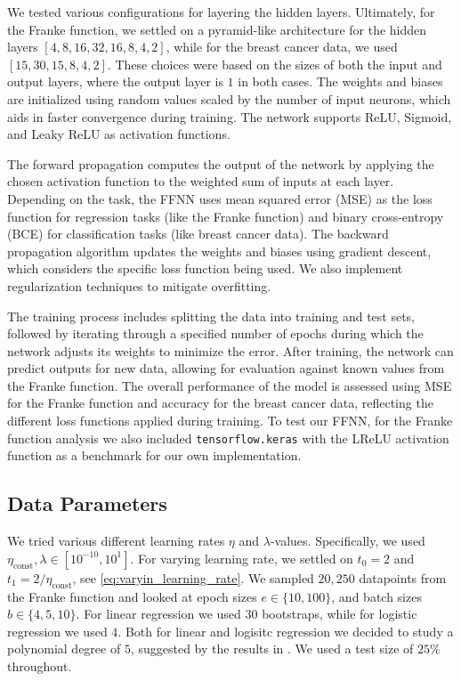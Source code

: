 \documentclass[%
reprint,s
amsmath,amssymb,
aps,
]{revtex4-2}
\begin{document}
We tested various configurations for layering the hidden layers. Ultimately, for the Franke function, we settled on a pyramid-like architecture for the hidden layers \([4,8,16,32,16,8,4,2]\), while for the breast cancer data, we used \([15,30,15,8,4,2]\). These choices were based on the sizes of both the input and output layers, where the output layer is \(1\) in both cases. The weights and biases are initialized using random values scaled by the number of input neurons, which aids in faster convergence during training. The network supports ReLU, Sigmoid, and Leaky ReLU as activation functions. 

The forward propagation computes the output of the network by applying the chosen activation function to the weighted sum of inputs at each layer. Depending on the task, the FFNN uses mean squared error (MSE) as the loss function for regression tasks (like the Franke function) and binary cross-entropy (BCE) for classification tasks (like breast cancer data). The backward propagation algorithm updates the weights and biases using gradient descent, which considers the specific loss function being used. We also implement regularization techniques to mitigate overfitting.

The training process includes splitting the data into training and test sets, followed by iterating through a specified number of epochs during which the network adjusts its weights to minimize the error. After training, the network can predict outputs for new data, allowing for evaluation against known values from the Franke function. The overall performance of the model is assessed using MSE for the Franke function and accuracy for the breast cancer data, reflecting the different loss functions applied during training. To test our FFNN, for the Franke function analysis we also included \texttt{tensorflow.keras} with the LReLU activation function as a benchmark for our own implementation.

\subsection{Data Parameters}
We tried various different learning rates \(\eta\) and \(\lambda\)-values. Specifically, we used \(\eta_{\text{const}}, \lambda \in[10^{-10}, 10^{1}]\). For varying learning rate, we settled on \(t_0=2\) and \(t_{1} = 2 / \eta_{\text{const}} \), see \eqref{eq:varyin_learning_rate}. We sampled \(20, 250\) datapoints from the Franke function and looked at epoch sizes \(e \in \{10, 100\}\), and batch sizes \(b\in\{4, 5, 10\}\). For linear regression we used \(30\) bootstraps, while for logistic regression we used \(4\). Both for linear and logisitc regression we decided to study a polynomial degree of \(5\), suggested by the results in \cite{project1}. We used a test size of \(25\%\) throughout. 
\end{document}
